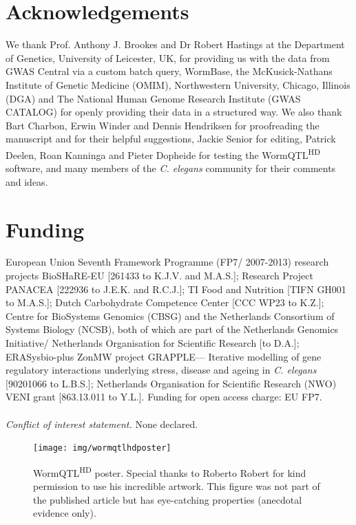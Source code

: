 \section*{Acknowledgements}
We thank Prof. Anthony J. Brookes and Dr Robert Hastings at the Department of Genetics, University of Leicester, UK, for providing us with the data from GWAS Central via a custom batch query, WormBase, the McKusick-Nathans Institute of Genetic Medicine (OMIM), Northwestern University, Chicago, Illinois (DGA) and The National Human Genome Research Institute (GWAS CATALOG) for openly providing their data in a structured way. We also thank Bart Charbon, Erwin Winder and Dennis Hendriksen for proofreading the manuscript and for their helpful suggestions, Jackie Senior for editing, Patrick Deelen, Roan Kanninga and Pieter Dopheide for testing the WormQTL\textsuperscript{HD} software, and many members of the \textsl{C. elegans} community for their comments and ideas.

\section*{Funding}
European Union Seventh Framework Programme (FP7/ 2007-2013) research projects BioSHaRE-EU [261433 to K.J.V. and M.A.S.]; Research Project PANACEA [222936 to J.E.K. and R.C.J.]; TI Food and Nutrition [TIFN GH001 to M.A.S.]; Dutch Carbohydrate Competence Center [CCC WP23 to K.Z.]; Centre for BioSystems Genomics (CBSG) and the Netherlands Consortium of Systems Biology (NCSB), both of which are part of the Netherlands Genomics Initiative/ Netherlands Organisation for Scientific Research [to D.A.]; ERASysbio-plus ZonMW project GRAPPLE— Iterative modelling of gene regulatory interactions underlying stress, disease and ageing in \textsl{C. elegans} [90201066 to L.B.S.]; Netherlands Organisation for Scientific Research (NWO) VENI grant [863.13.011 to Y.L.]. Funding for open access charge: EU FP7.
\\~\\
\textsl{Conflict of interest statement.} None declared.

\begin{figure}
	\texttt{[image: img/wormqtlhdposter]}
	\caption[WormQTL\textsuperscript{HD} poster]{WormQTL\textsuperscript{HD} poster. Special thanks to Roberto Robert for kind permission to use his incredible artwork. This figure was not part of the published article but has eye-catching properties (anecdotal evidence only). }
	\label{fig:wormqtlhdposter}
\end{figure}
